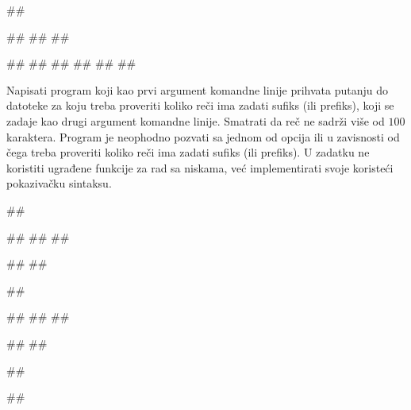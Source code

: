 \begin{miditest}
\begin{upotreba}{3}
##

##
##
##

#\naslovInt#
#\naslovIzlazZaGresku#
##
##
##
##
\end{upotreba}
\end{miditest}


\begin{Exercise}[label=2_07]
Napisati program koji kao prvi argument komandne linije prihvata
putanju do datoteke za koju treba proveriti koliko reči ima
zadati sufiks (ili prefiks), koji se zadaje kao drugi argument
komandne linije. Smatrati da reč ne sadrži više od $100$ karaktera.
Program je neophodno pozvati sa jednom od opcija
 ili  u zavisnosti od čega treba proveriti
koliko reči ima zadati sufiks (ili prefiks). U zadatku ne
koristiti ugrađene funkcije za rad sa niskama, već
implementirati svoje koristeći pokazivačku sintaksu.

\begin{miditest}
\begin{upotreba}{1}
##

##
##
##

#\naslovInt#
##
\end{upotreba}
\end{miditest}
\begin{miditest}
\begin{upotreba}{2}
##

##
##
##

#\naslovInt#
##
\end{upotreba}
\end{miditest}

\begin{miditest}
\begin{upotreba}{3}
##

##


\end{upotreba}
\end{miditest}
\end{Exercise}
